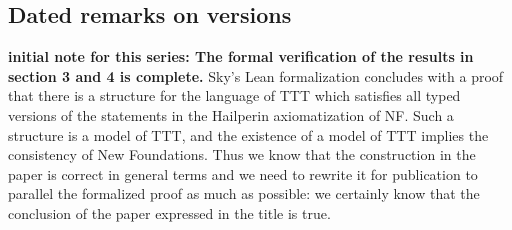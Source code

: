 \documentclass[112pt]{article}
\theoremstyle{definition}
\theoremstyle{remark}
\begin{document}
\subsection{Dated remarks on versions}

{\bf initial note for this series:  The formal verification of the results in section 3 and 4 is complete.} Sky's Lean formalization concludes with a proof that there is a structure for the language of TTT which satisfies all typed versions of the statements
in the Hailperin axiomatization of NF.  Such a structure is a model of TTT, and the existence of a model of TTT implies the consistency of New Foundations.  Thus we know that the construction in the paper is correct in general terms and we need to rewrite it for publication to parallel the formalized proof as much as possible:  we certainly know that the conclusion of the paper expressed in the title is true.
\end{document}
